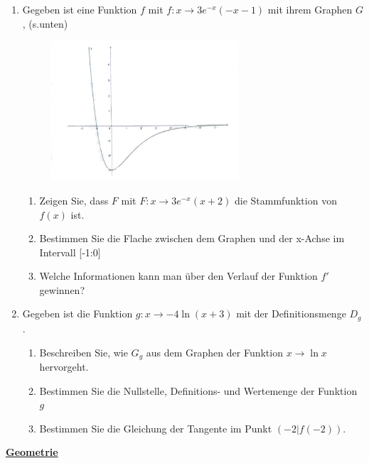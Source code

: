 \documentclass[a4paper,12pt]{article}
\begin{document}
\begin{enumerate}
  \item Gegeben ist eine Funktion $f$ mit $f: x \rightarrow 3e^{-x}(-x-1)$ mit ihrem Graphen $G$, (s.unten)

\begin{figure}[ht!]
\centering
\includegraphics[width=70mm]{g3.jpg}
\end{figure}


  \begin{enumerate}[label={\alph*)}]
    \item Zeigen Sie, dass $F$ mit $F: x \rightarrow 3e^{-x}(x+2)$ die Stammfunktion von $f(x)$ ist.
    \item Bestimmen Sie die Flache zwischen dem Graphen und der x-Achse im Intervall [-1:0]
    \item Welche Informationen kann man über den Verlauf der Funktion $f'$ gewinnen?
  \end{enumerate}

\item Gegeben ist die Funktion $g:x \rightarrow -4\ln{(x+3)}$ mit der Definitionsmenge $D_g$.

  \begin{enumerate}[label={\alph*)}]
    \item Beschreiben Sie, wie $G_g$ aus dem Graphen der Funktion $x \rightarrow \ln x$ hervorgeht.
    \item Bestimmen Sie die Nullstelle, Definitions- und Wertemenge der Funktion $g$
    \item Bestimmen Sie die Gleichung der Tangente im Punkt $(-2 | f(-2))$.
  \end{enumerate}
\end{enumerate}

\newpage

\underline{\textbf{Geometrie}}
\end{document}
